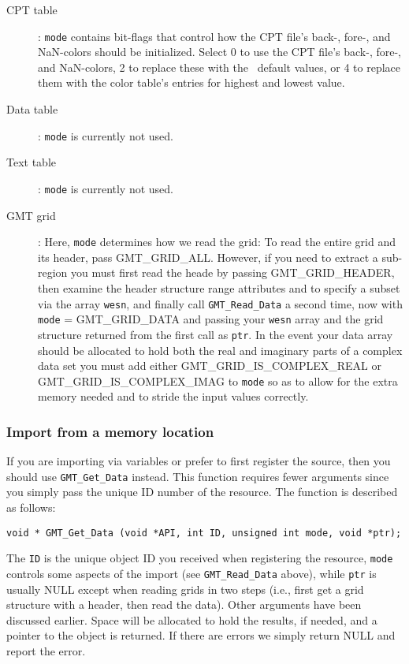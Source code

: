 \documentclass[11pt]{report}
\begin{document}
\begin{description}
\item [CPT table]:  \texttt{mode} contains bit-flags that control how the CPT file's back-, fore-, and NaN-colors
should be initialized.  Select 0 to use the CPT file's back-, fore-, and NaN-colors, 2
to replace these with the \GMT\ default values, or 4 to replace them with the color table's
entries for highest and lowest value.
\item [Data table]:  \texttt{mode} is currently not used.
\item [Text table]:  \texttt{mode} is currently not used.
\item [GMT grid]:  Here, \texttt{mode} determines how we read the grid:
To read the entire grid and its header, pass GMT\_GRID\_ALL.  However, if you
need to extract a sub-region you must first read the heade by passing
GMT\_GRID\_HEADER, then examine the header structure range attributes and
to specify a subset via the array \texttt{wesn}, and finally call
\texttt{GMT\_Read\_Data} a second time, now with \texttt{mode} = GMT\_GRID\_DATA and passing your \texttt{wesn} array
and the grid structure returned from the first call as \texttt{ptr}.
In the event your data array should be allocated to hold both the real and imaginary parts of a
complex data set you must add either GMT\_GRID\_IS\_COMPLEX\_REAL or GMT\_GRID\_IS\_COMPLEX\_IMAG to \texttt{mode}
so as to allow for the extra memory needed and to stride the input values correctly.
\end{description}

\subsubsection{Import from a memory location}

If you are importing via variables or prefer to first register the source, then you
should use \texttt{GMT\_Get\_Data} instead.  This function requires fewer arguments since you simply
pass the unique ID number of the resource.  The function is described as follows:


\begin{verbatim}
void * GMT_Get_Data (void *API, int ID, unsigned int mode, void *ptr);
\end{verbatim}
The \texttt{ID} is the unique object ID you received when registering the resource,
\texttt{mode} controls some aspects of the import (see \texttt{GMT\_Read\_Data} above),
while \texttt{ptr} is usually NULL except when reading grids in two steps
(i.e., first get a grid structure with a header, then read the data).
Other arguments have been discussed earlier.  
Space will be allocated to hold the results, if needed, and a pointer to the object is returned.
If there are errors we simply return NULL and report the error.
\end{document}
